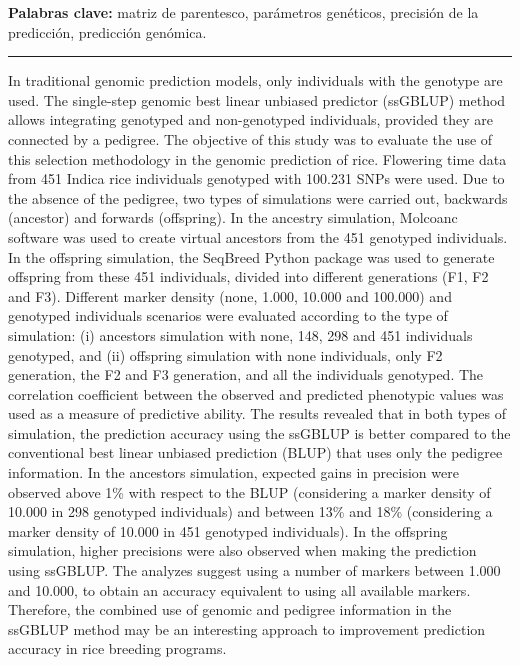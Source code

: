 \documentclass[11pt,spanish,a4paper,oneside,]{book} %
\begin{document}
\hspace*{1em}

\noindent 
\textbf{Palabras clave:} matriz de parentesco, parámetros genéticos, precisión de la predicción, predicción genómica.

\begin{center}\rule{0.5\linewidth}{0.5pt}\end{center}

\noindent 
In traditional genomic prediction models, only individuals with the genotype are used. The single-step genomic best linear unbiased predictor (ssGBLUP) method allows integrating genotyped and non-genotyped individuals, provided they are connected by a pedigree. The objective of this study was to evaluate the use of this selection methodology in the genomic prediction of rice. Flowering time data from 451 Indica rice individuals genotyped with 100.231 SNPs were used. Due to the absence of the pedigree, two types of simulations were carried out, backwards (ancestor) and forwards (offspring). In the ancestry simulation, Molcoanc software was used to create virtual ancestors from the 451 genotyped individuals. In the offspring simulation, the SeqBreed Python package was used to generate offspring from these 451 individuals, divided into different generations (F1, F2 and F3). Different marker density (none, 1.000, 10.000 and 100.000) and genotyped individuals scenarios were evaluated according to the type of simulation: (i) ancestors simulation with none, 148, 298 and 451 individuals genotyped, and (ii) offspring simulation with none individuals, only F2 generation, the F2 and F3 generation, and all the individuals genotyped. The correlation coefficient between the observed and predicted phenotypic values was used as a measure of predictive ability. The results revealed that in both types of simulation, the prediction accuracy using the ssGBLUP is better compared to the conventional best linear unbiased prediction (BLUP) that uses only the pedigree information. In the ancestors simulation, expected gains in precision were observed above 1\% with respect to the BLUP (considering a marker density of 10.000 in 298 genotyped individuals) and between 13\% and 18\% (considering a marker density of 10.000 in 451 genotyped individuals). In the offspring simulation, higher precisions were also observed when making the prediction using ssGBLUP. The analyzes suggest using a number of markers between 1.000 and 10.000, to obtain an accuracy equivalent to using all available markers. Therefore, the combined use of genomic and pedigree information in the ssGBLUP method may be an interesting approach to improvement prediction accuracy in rice breeding programs.
\end{document}
